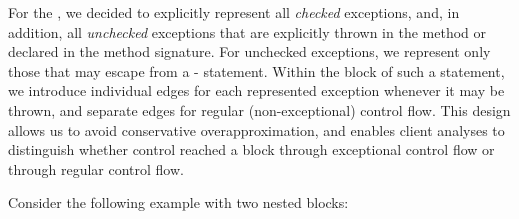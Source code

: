 For the
{\intraj} {\CFG}, we decided to explicitly represent all \emph{checked} exceptions, and, in addition,
all \emph{unchecked} exceptions that are explicitly thrown in the method or declared in the
method signature.
For unchecked exceptions, we represent only those that may escape from a {-} statement.
Within the  block of such a statement, we introduce individual {\CFG}
edges for each represented exception whenever it may be thrown,
and separate edges for regular (non-exceptional) control flow.
This design allows us to avoid conservative overapproximation, and enables client analyses to distinguish whether control reached a  block through exceptional control flow or through regular control flow.

Consider the following example with two nested  blocks:

